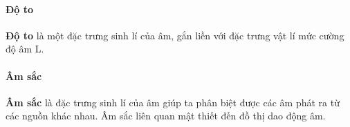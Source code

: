 \paragraph{Độ to}
\textbf{Độ to} là một đặc trưng sinh lí của âm, gắn liền với đặc trưng vật lí mức cường độ âm L.
\paragraph{Âm sắc}
\textbf{Âm sắc} là đặc trưng sinh lí của âm giúp ta phân biệt được các âm phát ra từ các nguồn khác nhau. Âm sắc liên quan mật thiết đến đồ thị dao động âm.


